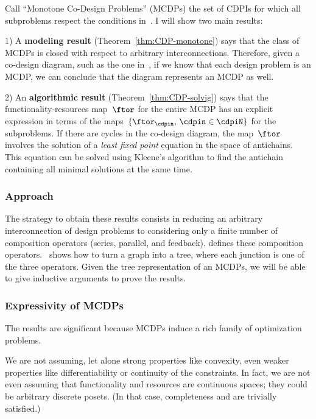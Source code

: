 Call ``Monotone Co-Design Problems'' (MCDPs) the set of CDPIs for
which all subproblems respect the conditions in~.
 I will show two main results:

1) A \textbf{modeling result} (Theorem~\vref{thm:CDP-monotone})
says that the class of MCDPs is closed with respect to arbitrary interconnections.
Therefore, given a co-design diagram, such as the one in~,
if we know that each design problem is an MCDP, we can conclude that
the diagram represents an MCDP as well.

2) An \textbf{algorithmic result }(Theorem~\vref{thm:CDP-solvig})
says that the functionality-resources map~$\ftor$ for the entire
MCDP has an explicit expression in terms of the maps~$\{\ftor_{\cdpin},\,\cdpin\in\cdpiN\}$
for the subproblems. If there are cycles in the co-design diagram,
the map~$\ftor$ involves the solution of a\emph{ least fixed point}
equation in the space of antichains. This equation can be solved using
Kleene's algorithm to find the antichain containing all minimal solutions
at the same time.

\subsubsection*{Approach}

The strategy to obtain these results consists in reducing an arbitrary
interconnection of design problems to considering\emph{ }only a finite
number of composition operators (series, parallel, and feedback).
 defines these composition operators. ~shows
how to turn a graph into a tree, where each junction is one of the
three operators. Given the tree representation of an MCDPs, we will
be able to give inductive arguments to prove the results. 


\subsubsection*{Expressivity of MCDPs}

The results are significant because MCDPs induce a rich family of
optimization problems. 

We are not assuming, let alone strong properties like convexity, even
weaker properties like differentiability or continuity of the constraints.
In fact, we are not even assuming that functionality and resources
are continuous spaces; they could be arbitrary discrete posets. (In
that case, completeness and \scottcontinuity are trivially satisfied.)

